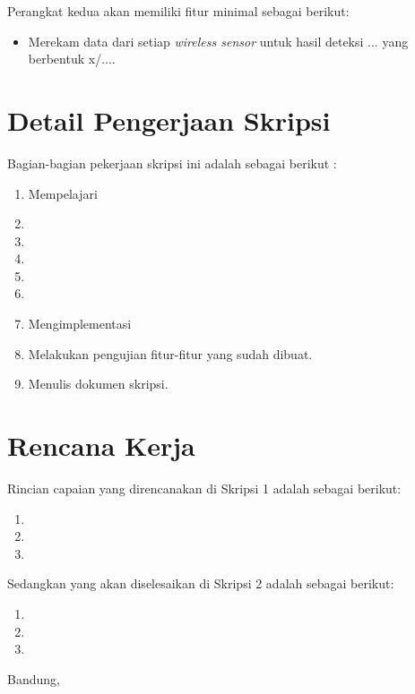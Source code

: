 \documentclass[a4paper,twoside]{article}
\begin{document}
Perangkat kedua akan memiliki fitur minimal sebagai berikut:
\begin{itemize}
	\item Merekam data dari setiap {\it wireless sensor} untuk hasil deteksi ... yang berbentuk x/....
\end{itemize}

\section{Detail Pengerjaan Skripsi}
Bagian-bagian pekerjaan skripsi ini adalah sebagai berikut :
	\begin{enumerate}
		\item Mempelajari 
		\item 
		\item 
		\item 
		\item 
		\item 
		\item Mengimplementasi 
		\item Melakukan pengujian fitur-fitur yang sudah dibuat.
		\item Menulis dokumen skripsi.
	\end{enumerate}

\section{Rencana Kerja}
Rincian capaian yang direncanakan di Skripsi 1 adalah sebagai berikut:
\begin{enumerate}
\item 
\item 
\item 
\end{enumerate}

Sedangkan yang akan diselesaikan di Skripsi 2 adalah sebagai berikut:
\begin{enumerate}
\item 
\item 
\item 
\end{enumerate}

\vspace{1cm}
\centering Bandung, \tanggal\\
\vspace{2cm} \nama \\ 
\vspace{1cm}
\end{document}
